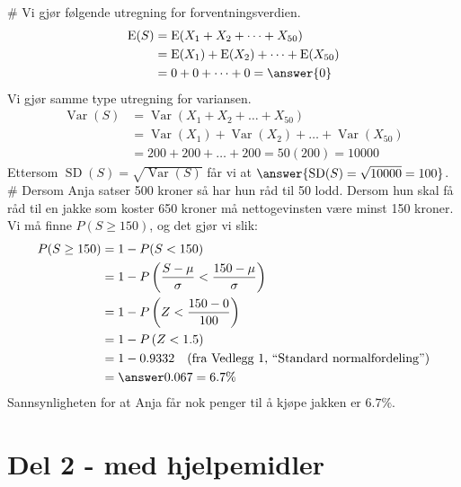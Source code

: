 \begin{easylist}[enumerate]
# Vi gjør følgende utregning for forventningsverdien.
\begin{align*}
	\operatorname{E}(S) &= \operatorname{E}(X_1 + X_2 + \dots + X_{50}) \\
	&= \operatorname{E}(X_1) + \operatorname{E}(X_2) + \dots + \operatorname{E}(X_{50}) \\
	&= 0 + 0 + \dots + 0 = \answer{0}
\end{align*}
Vi gjør samme type utregning for variansen.
\begin{align*}
\operatorname{Var}(S) &= \operatorname{Var}(X_1 + X_2 + \dots + X_{50}) \\
&= \operatorname{Var}(X_1) + \operatorname{Var}(X_2) + \dots + \operatorname{Var}(X_{50}) \\
&= 200 + 200 + \dots + 200 = 50 (200) = 10000
\end{align*}
Ettersom $\operatorname{SD}(S) = \sqrt{\operatorname{Var}(S)}$ får vi at $\answer{\operatorname{SD}(S) = \sqrt{10000} = 100}$.
# Dersom Anja satser 500 kroner så har hun råd til 50 lodd.
Dersom hun skal få råd til en jakke som koster 650 kroner må nettogevinsten
være minst 150 kroner. Vi må finne $P(S \geq 150)$, og det gjør vi slik:
\begin{align*}
	P(S \geq 150) &= 1 - P(S < 150) \\
	&= 1 - P\left( \frac{S - \mu}{\sigma} < \frac{150 - \mu}{\sigma}\right) \\
	&= 1 - P\left( Z < \frac{150 - 0}{100}\right) \\
	&= 1 - P\left( Z < 1.5\right) \\
	&= 1 - 0.9332 \quad \text{(fra Vedlegg 1, ``Standard normalfordeling'')} \\
	&= \answer{0.067 = 6.7 \%}
\end{align*}
Sannsynligheten for at Anja får nok penger til å kjøpe jakken er $6.7 \%$.
\end{easylist}



\section*{Del 2 - med hjelpemidler}

